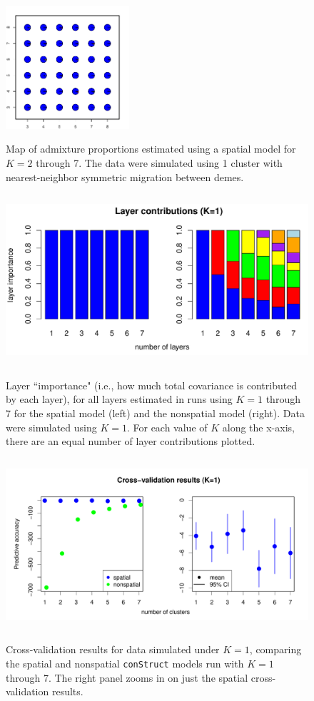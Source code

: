 \documentclass[12pt]{article}
\begin{document}
\begin{figure}
			{\includegraphics[width=1.8in,height=1.8in]{figs/sims/simK1_sp_pies_K7.pdf}}
	\caption{
	Map of admixture proportions estimated using a spatial model for $K=2$ through 7.
	The data were simulated using 1 cluster with nearest-neighbor symmetric migration between demes.
    }\label{simK1_sp_pies}
\end{figure}

\begin{figure}
	\centering
		{\includegraphics[width=5in,height=2.5in]{figs/sims/simK1_laycon_barplots.pdf}}
		\caption{
			Layer ``importance" (i.e., how much total covariance is contributed by each layer), 
			for all layers estimated in runs using $K = 1$ through 7 
			for the spatial model (left) and the nonspatial model (right).
			Data were simulated using $K=1$.
			For each value of $K$ along the x-axis, there are an equal number of layer contributions plotted.
		}\label{simK1_laycon}
\end{figure}

\begin{figure}
	\centering
		{\includegraphics[width=5in,height=2.5in]{figs/sims/simK1_std_xval.pdf}}
		\caption{
			Cross-validation results for data simulated under $K=1$,
			comparing the spatial and nonspatial \texttt{conStruct} models run with $K=1$ through 7.  
			The right panel zooms in on just the spatial cross-validation results.
		}\label{simK1_xval}
\end{figure}
\end{document}

